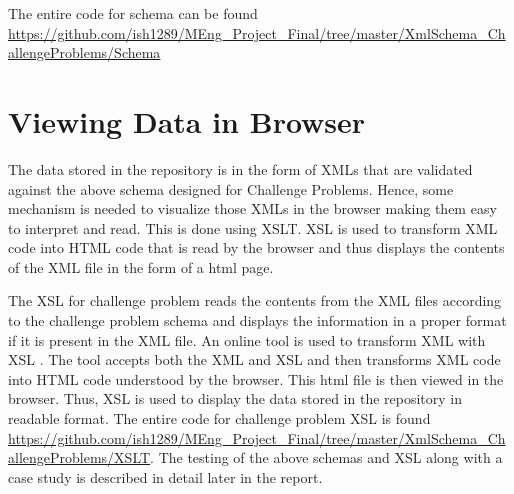 \documentclass[11pt,letterpaper]{report}
\begin{document}
The entire code for schema can be found \url{https://github.com/ish1289/MEng_Project_Final/tree/master/XmlSchema_ChallengeProblems/Schema}



\section{Viewing Data in Browser}
The data stored in the repository is in the form of XMLs that are validated against the above schema designed for Challenge Problems. Hence, some mechanism is needed to visualize those XMLs in the browser making them easy to interpret and read. This is done using XSLT. XSL is used to transform XML code into HTML code that is read by the browser and thus displays the contents of the XML file in the form of a html page. 

The XSL for challenge problem reads the contents from the XML files according to the challenge problem schema and displays the information in a proper format if it is present in the XML file. An online tool is used to transform XML with XSL \cite{olXSL}. The tool accepts both the XML and XSL and then transforms XML code into HTML code understood by the browser. This html file is then viewed in the browser. Thus, XSL is used to display the data stored in the repository in readable format. The entire code for challenge problem XSL is found \url{https://github.com/ish1289/MEng_Project_Final/tree/master/XmlSchema_ChallengeProblems/XSLT}.
The testing of the above schemas and XSL along with a case study is described in detail later in the report. 
\end{document}
